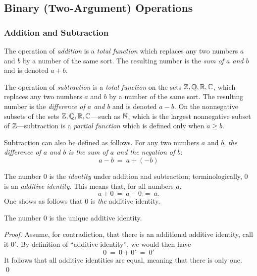 \subsection{Binary (Two-Argument) Operations}
\label{sec:binary-operators}

\subsubsection{Addition and Subtraction}
 

The operation of {\it addition} is a {\em total function} which replaces any two numbers $a$ and $b$ by a number of the same sort.  The resulting number is the {\em sum of $a$ and $b$} and is denoted $a+b$.

\smallskip

 
\noindent
The operation of {\it subtraction} is a {\em total function} on the sets $\mathbb{Z}, \mathbb{Q}, \mathbb{R}, \mathbb{C}$, which replaces any two numbers $a$ and $b$ by a number of the same sort.  The resulting number is the {\em difference of $a$ and $b$} and is denoted $a-b$.  On the nonnegative subsets of the sets $\mathbb{Z}, \mathbb{Q}, \mathbb{R}, \mathbb{C}$---such as $\mathbb{N}$, which is the largest nonnegative subset of $\mathbb{Z}$---subtraction is a {\em partial function} which is defined only when $a \geq b$.

\smallskip

Subtraction can also be defined as follows.  For any two numbers $a$ and $b$, {\em the difference of $a$ and $b$ is the sum of $a$ and the negation of $b$}:
\[ a-b \ = \ a + (-b) \]

\medskip


The number $0$ is the {\it identity} under addition and subtraction; terminologically, $0$ is an {\it additive identity}.  This means that, for all numbers $a$,
\[ a+0 \ = \ a-0 \ = \ a. \]
One shows as follows that $0$ is {\em the} additive identity.

\begin{prop}
\label{thm:unique-add-iden}
The number $0$ is the unique additive identity.
\end{prop}

\begin{proof}
Assume, for contradiction, that there is an additional additive identity, call it $0'$.  By definition of ``additive identity'', we would then have
\[ 0 \ = \ 0 + 0' \ = \ 0' \]
It follows that all additive identities are equal, meaning that there is only one.  \qed
\end{proof}

